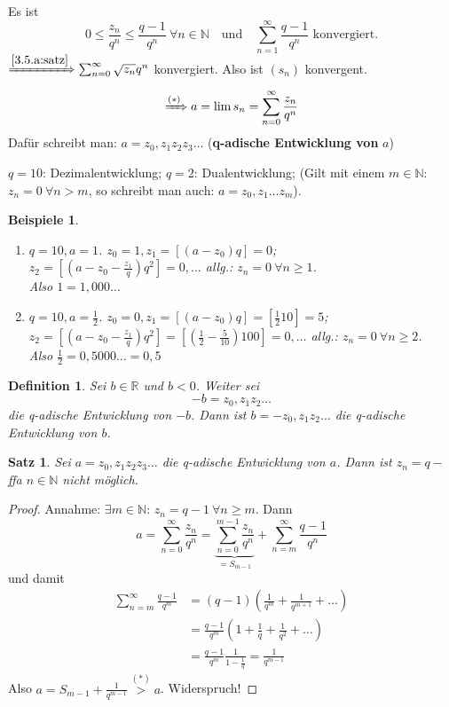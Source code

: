 \documentclass[titlepage,ngerman,a4paper,headsepline]{scrartcl}
\newcommand{\N}{\mathbb{N}}
\newcommand{\R}{\mathbb{R}}
\theoremstyle{named}
\theoremstyle{dotless}
\newtheorem{satz}[namedtheorem]{Satz}
\newtheorem*{beispiele}{Beispiele}
\newtheorem*{definition}{Definition}
\begin{document}
Es ist
	$$ 0 \leq \frac{z_{n}}{q^{n}} \leq \frac{q - 1}{q^n} ~\forall n \in \N \quad \text{und} \quad \sum_{n=1}^{\infty} \frac{q - 1}{q^{n}} \text{ konvergiert}. $$
$\xRightarrow[]{\ref{3.5.a:satz}} \sum_{n=0}^{\infty}\sqrt{z_{n}}{q^{n}}$ konvergiert. Also ist $(s_{n})$ konvergent.
	$$ \xRightarrow[]{(*)} a = \lim s_{n} = \sum_{n=0}^{\infty} \frac{z_{n}}{q^{n}} $$
Dafür schreibt man: $a = z_{0}, z_{1} z_{2} z_{3} \dotsc$ (\textbf{q-adische Entwicklung von }$a$)

$q = 10$: Dezimalentwicklung; $q = 2$: Dualentwicklung; (Gilt mit einem $m \in \N$: $z_{n} = 0 ~\forall n > m$, so schreibt man auch: $a = z_{0}, z_{1} \dotsc z_{m}$).


\begin{beispiele} ~\
	\begin{enumerate}
		\item $q = 10, a = 1$. $z_{0} = 1, z_{1} = [(a - z_{0})q] = 0$; \\
			$z_{2} = [(a - z_{0} - \frac{z_{1}}{q})q^{2}] = 0, \dotsc$ allg.: $z_{n} = 0 ~\forall n \geq 1$. \\
			Also $1 = 1,000\dotsc$
		\item $q = 10, a = \frac{1}{2}$. $z_{0} = 0, z_{1} = [(a - z_{0})q] = [\frac{1}{2} 10] = 5$; \\
			$z_{2} = [(a - z_{0} - \frac{z_{1}}{q})q^{2}] = [(\frac{1}{2} - \frac{5}{10}) 100] = 0, \dotsc$ allg.: $z_{n} = 0 ~\forall n \geq 2$. \\
			Also $\frac{1}{2} = 0,5000\dotsc = 0,5$
	\end{enumerate}
\end{beispiele}


\begin{definition}
	Sei $b \in \R$ und $b < 0$. Weiter sei
		$$ -b = z_{0}, z_{1} z_{2} \dotsc $$
	die q-adische Entwicklung von $-b$. Dann ist $b = - z_{0}, z_{1} z_{2} \dotsc$ die q-adische Entwicklung von $b$.
\end{definition}


\begin{satz} \label{5.2:satz}
	Sei $a = z_{0}, z_{1} z_{2} z_{3} \dotsc$ die q-adische Entwicklung von $a$. Dann ist $z_{n} = q -$ ffa $n \in \N$ nicht möglich.
\end{satz}

\begin{proof}
	Annahme: $\exists m \in \N$: $z_{n} = q - 1 ~\forall n \geq m$. Dann 
		$$ a = \sum_{n=0}^{\infty} \frac{z_{n}}{q^{n}} = \underbrace{\sum_{n=0}^{m-1} \frac{z_{n}}{q^{n}}}_{= S_{m-1}} + \sum_{n=m}^{\infty} \frac{q-1}{q^{n}} $$
	und damit
	\begin{align*}
		\sum_{n=m}^{\infty} \frac{q-1}{q^{m}} & = (q-1) \left( \frac{1}{q^{m}} + \frac{1}{q^{m+1}} + \dotsc \right) \\
			& = \frac{q - 1}{q^{m}} (1 + \frac{1}{q} + \frac{1}{q^{2}} + \dotsc) \\
			& = \frac{q - 1}{q^{m}} \frac{1}{1 - \frac{1}{q}} = \frac{1}{q^{m-1}}
	\end{align*} 
	Also $a = S_{m-1} + \frac{1}{q^{m-1}} \overset{(*)}{>} a$. Widerspruch!
\end{proof}
\end{document}
